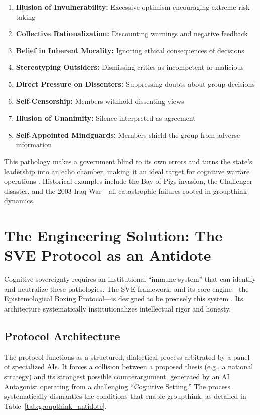 \documentclass[11pt,a4paper]{article}
\begin{document}
\begin{enumerate}[nosep]
    \item \textbf{Illusion of Invulnerability:} Excessive optimism encouraging extreme risk-taking \citep[lines 585--587, 785]{AnalyticalReport2025}
    \item \textbf{Collective Rationalization:} Discounting warnings and negative feedback \citep[lines 585--587, 789--791]{AnalyticalReport2025}
    \item \textbf{Belief in Inherent Morality:} Ignoring ethical consequences of decisions
    \item \textbf{Stereotyping Outsiders:} Dismissing critics as incompetent or malicious
    \item \textbf{Direct Pressure on Dissenters:} Suppressing doubts about group decisions
    \item \textbf{Self-Censorship:} Members withhold dissenting views \citep[lines 585--587, 795]{AnalyticalReport2025}
    \item \textbf{Illusion of Unanimity:} Silence interpreted as agreement
    \item \textbf{Self-Appointed Mindguards:} Members shield the group from adverse information \citep[lines 585--587, 798]{AnalyticalReport2025}
\end{enumerate}

This pathology makes a government blind to its own errors and turns the state's leadership into an echo chamber, making it an ideal target for cognitive warfare operations \citep[lines 636--637]{AnalyticalReport2025}. Historical examples include the Bay of Pigs invasion, the Challenger disaster, and the 2003 Iraq War—all catastrophic failures rooted in groupthink dynamics.

\section{The Engineering Solution: The SVE Protocol as an Antidote}
Cognitive sovereignty requires an institutional ``immune system'' that can identify and neutralize these pathologies. The SVE framework, and its core engine—the Epistemological Boxing Protocol—is designed to be precisely this system \citep{Kovnatsky2025Boxing}. Its architecture systematically institutionalizes intellectual rigor and honesty.

\subsection{Protocol Architecture}
The protocol functions as a structured, dialectical process arbitrated by a panel of specialized AIs. It forces a collision between a proposed thesis (e.g., a national strategy) and its strongest possible counterargument, generated by an AI Antagonist operating from a challenging ``Cognitive Setting.'' The process systematically dismantles the conditions that enable groupthink, as detailed in Table~\ref{tab:groupthink_antidote}.
\end{document}
